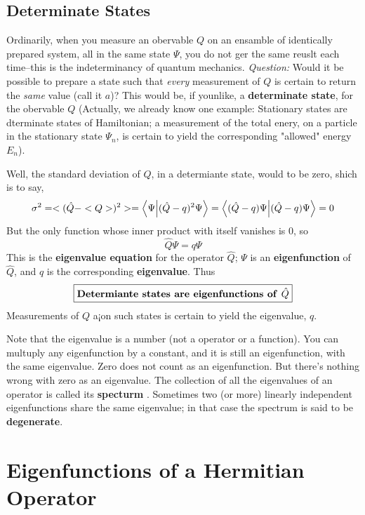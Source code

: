 \subsection{Determinate States}
Ordinarily, when you measure an obervable $Q$ on an ensamble of identically prepared system, all in the same state $\Psi$, you do not ger the same reuslt each time--this is the indeterminancy of quantum mechanics. \textit{Question:} Would it be possible to prepare a state such that \textit{every} measurement of $Q$ is certain to return the \textit{same} value (call it $a$)? This would be, if younlike, a \textbf{determinate state}, for the obervable $Q$ (Actually, we already know one example: Stationary states are dterminate states of Hamiltonian; a measurement of the total enery, on a particle in the stationary state $\Psi_n$, is certain to yield the corresponding "allowed" energy $E_n$).

Well, the standard deviation of $Q$, in a determiante state, would to be zero, shich is to say,
\begin{equation}\label{3.21}
	\sigma^2=<(\hat{Q}-<Q>)^2>=\bra{\Psi}\ket{(\hat{Q}-q)^2\Psi}=\bra{(\hat{Q}-q)\Psi}\ket{(\hat{Q}-q)\Psi}=0
\end{equation}
But the only function whose inner product with itself vanishes is $0$, so
\begin{equation}\label{3.22}
	\hat{Q}\Psi=q\Psi
\end{equation}
This is the \textbf{eigenvalue equation} for the operator $\hat{Q}$; $\Psi$ is an \textbf{eigenfunction} of $\hat{Q}$, and $q$ is the corresponding \textbf{eigenvalue}. Thus
\begin{equation}\label{3.23}
	\boxed{\mbox{\textbf{Determiante states are eigenfunctions of }$\hat{Q}$}}
\end{equation}
Measurements of $Q$ a¡on such states is certain to yield the eigenvalue, $q$.

Note that the eigenvalue is a number (not a operator or a function). You can multuply any eigenfunction by a constant,  and it is still an eigenfunction, with the same eigenvalue. Zero does not count as an eigenfunction. But there's nothing wrong with zero as an eigenvalue. The collection of all the eigenvalues of an operator is called its \textbf{specturm} . Sometimes two (or more) linearly independent eigenfunctions share the same eigenvalue; in that case the spectrum is said to be \textbf{degenerate}.

\section{Eigenfunctions of a Hermitian Operator}

















